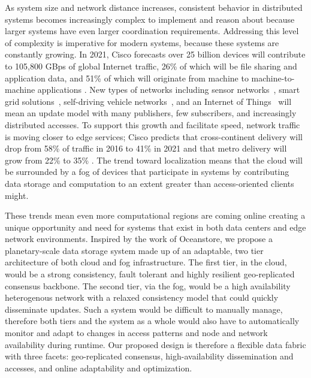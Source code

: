 As system size and network distance increases, consistent behavior in distributed systems becomes increasingly complex to implement and reason about because larger systems have even larger coordination requirements.
Addressing this level of complexity is imperative for modern systems, because these systems are constantly growing.
In 2021, Cisco forecasts over 25 billion devices will contribute to 105,800 GBps of global Internet traffic, 26\% of which will be file sharing and application data, and 51\% of which will originate from machine to machine-to-machine applications \cite{cisco_internet_trends}.
New types of networks including sensor networks~\cite{sensor_networks}, smart grid solutions~\cite{smart_grid}, self-driving vehicle networks~\cite{sotis}, and an Internet of Things~\cite{iot} will mean an update model with many publishers, few subscribers, and increasingly distributed accesses.
To support this growth and facilitate speed, network traffic is moving closer to edge services; Cisco predicts that cross-continent delivery will drop from 58\% of traffic in 2016 to 41\% in 2021 and that metro delivery will grow from 22\% to 35\% \cite{cisco_internet_trends}.
The trend toward localization means that the cloud will be surrounded by a fog of devices that participate in systems by contributing data storage and computation to an extent greater than access-oriented clients might.

These trends mean even more computational regions are coming online creating a unique opportunity and need for systems that exist in both data centers and edge network environments.
Inspired by the work of Oceanstore, we propose a planetary-scale data storage system made up of an adaptable, two tier architecture of both cloud and fog infrastructure.
The first tier, in the cloud, would be a strong consistency, fault tolerant and highly resilient geo-replicated consensus backbone.
The second tier, via the fog, would be a high availability heterogenous network with a relaxed consistency model that could quickly disseminate updates.
Such a system would be difficult to manually manage, therefore both tiers and the system as a whole would also have to automatically monitor and adapt to changes in access patterns and node and network availability during runtime.
Our proposed design is therefore a flexible data fabric with three facets: geo-replicated consensus, high-availability dissemination and accesses, and online adaptability and optimization.

